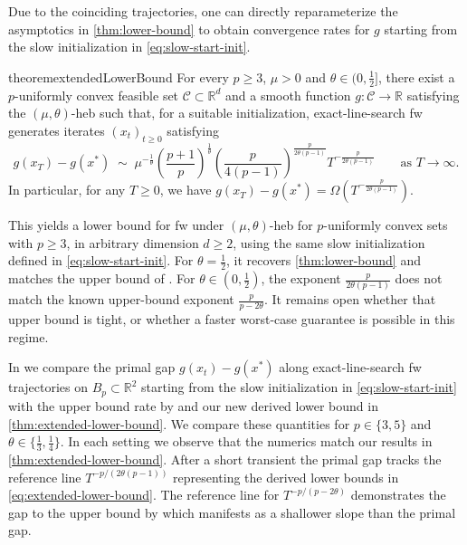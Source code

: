 \documentclass{article}
\newcommand{\R}{\mathbb{R}}
\newcommand\linktoproof[1]{{\hspace{-0.3em}\normalfont[{\hyperlink{proof:#1}{$\downarrow$}}]}}
\begin{document}
Due to the coinciding trajectories, one can directly reparameterize the asymptotics in \cref{thm:lower-bound} to obtain convergence rates for $g$ starting from the slow initialization in \eqref{eq:slow-start-init}.

\begin{restatable}{theorem}{extendedLowerBound}\label{thm:extended-lower-bound}\linktoproof{thm:extended-lower-bound}
    For every $p\ge 3$, $\mu>0$ and $\theta \in (0, \frac12]$, there exist a $p$-uniformly convex feasible set $\mathcal C \subset\mathbb R^d$ and a smooth function $g:\mathcal C \to\mathbb R$ satisfying the $(\mu, \theta)$-\gls{heb} such that, for a suitable initialization, exact-line-search \gls{fw} generates iterates $(x_t)_{t\geq 0}$ satisfying
    \begin{equation}\label{eq:extended-lower-bound}
        g(x_T)-g(x^*)
        \;\sim\;
    \mu^{-\frac{1}{\theta}}\left(\frac{p+1}{p}\right)^{\frac{1}{\theta}}
    \left(\frac{p}{4(p-1)}\right)^{\frac{p}{2\theta(p-1)}}
    T^{-\frac{p}{2\theta(p-1)}}
        \qquad\text{as }T\to\infty.
    \end{equation}
    In particular, for any $T \geq 0$, we have $g(x_T)-g(x^*) = \Omega \left(T^{-\frac{p}{2\theta(p-1)}} \right)$.
\end{restatable}
This yields a lower bound for \gls{fw} under $(\mu,\theta)$-\gls{heb} for $p$-uniformly convex sets with $p \geq 3$, in arbitrary dimension $d\ge 2$, using the same slow initialization defined in \eqref{eq:slow-start-init}.
For $\theta=\tfrac12$, it recovers \cref{thm:lower-bound} and matches the upper bound of \citet{kerdreux2021projection}.
For $\theta\in(0,\tfrac12)$, the exponent $\frac{p}{2\theta(p-1)}$ does not match the known upper-bound exponent $\frac{p}{p-2\theta}$.
It remains open whether that upper bound is tight, or whether a faster worst-case guarantee is possible in this regime.

In  we compare the primal gap $g(x_t)-g(x^*)$ along exact-line-search \gls{fw} trajectories on $B_p\subset\R^2$ starting from the slow initialization in \eqref{eq:slow-start-init} with the upper bound rate by \citet{kerdreux2021projection} and our new derived lower bound in \cref{thm:extended-lower-bound}.
We compare these quantities for $p\in\{3,5\}$ and $\theta\in\{\tfrac13,\tfrac14\}$.
In each setting we observe that the numerics match our results in \cref{thm:extended-lower-bound}.
After a short transient the primal gap tracks the reference line $T^{-p/(2\theta(p-1))}$ representing the derived lower bounds in \eqref{eq:extended-lower-bound}.
The reference line for $T^{-p/(p-2\theta)}$ demonstrates the gap to the upper bound by \citet{kerdreux2021projection} which manifests as a shallower slope than the primal gap.
\end{document}
